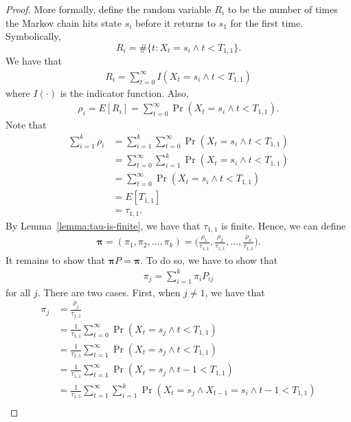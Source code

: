 \documentclass[10pt]{article}
\newcommand{\ves}[1]{\boldsymbol{#1}}
\begin{document}
\begin{itemize}
\begin{proof}
    More formally, define the random variable $R_i$ to be the number of times the Markov chain hits state $s_i$ before it returns to $s_1$ for the first time. Symbolically, $$R_i = \#\{ t : X_t = s_i \wedge t < T_{1,1} \}.$$ We have that
    \begin{align*}
        R_i = \sum_{t=0}^\infty I(X_t = s_i \wedge t < T_{1,1})
    \end{align*}
    where $I(\cdot)$ is the indicator function. Also,
    \begin{align*}
        \rho_i = E[R_i] = \sum_{t=0}^\infty \Pr(X_t = s_i \wedge t < T_{1,1}).
    \end{align*}
    Note that
    \begin{align*}
        \sum_{i=1}^k \rho_i 
        &= \sum_{i=1}^k \sum_{t=0}^\infty \Pr(X_t = s_i \wedge t < T_{1,1}) \\
        &= \sum_{t=0}^\infty \sum_{i=1}^k \Pr(X_t = s_i \wedge t < T_{1,1}) \\
        &= \sum_{t=0}^\infty \Pr(X_t = s_i \wedge t < T_{1,1}) \\
        &= E[T_{1,1}]\\
        &= \tau_{1,1}.
    \end{align*}
    By Lemma~\ref{lemma:tau-is-finite}, we have that $\tau_{1,1}$ is finite. Hence, we can define
    \begin{align*}
        \ves{\pi} = (\pi_1, \pi_2, \dotsc, \pi_k) = \bigg( \frac{\rho_1}{\tau_{1,1}}, \frac{\rho_2}{\tau_{1,1}}, \dotsc, \frac{\rho_k}{\tau_{1,1}} \bigg).
    \end{align*}
    It remains to show that $\ves{\pi}P = \ves{\pi}$. To do so, we have to show that
    \begin{align*}
        \pi_j = \sum_{i=1}^k \pi_i P_{ij}
    \end{align*}
    for all $j$. There are two cases. First, when $j \neq 1$, we have that
    \begin{align*}
        \pi_j 
        &= \frac{\rho_j}{\tau_{1,1}} \\
        &= \frac{1}{\tau_{1,1}} \sum_{t=0}^\infty \Pr(X_t = s_j \wedge t < T_{1,1}) \\
        &= \frac{1}{\tau_{1,1}} \sum_{t=1}^\infty \Pr(X_t = s_j \wedge t < T_{1,1}) \\
        &= \frac{1}{\tau_{1,1}} \sum_{t=1}^\infty \Pr(X_t = s_j \wedge t-1 < T_{1,1})
        \\
        &= \frac{1}{\tau_{1,1}} \sum_{t=1}^\infty \sum_{i=1}^k \Pr(X_t = s_j \wedge X_{t-1} = s_i \wedge t-1 < T_{1,1}) \\

\end{align*}
\end{proof}
\end{itemize}
\end{document}
